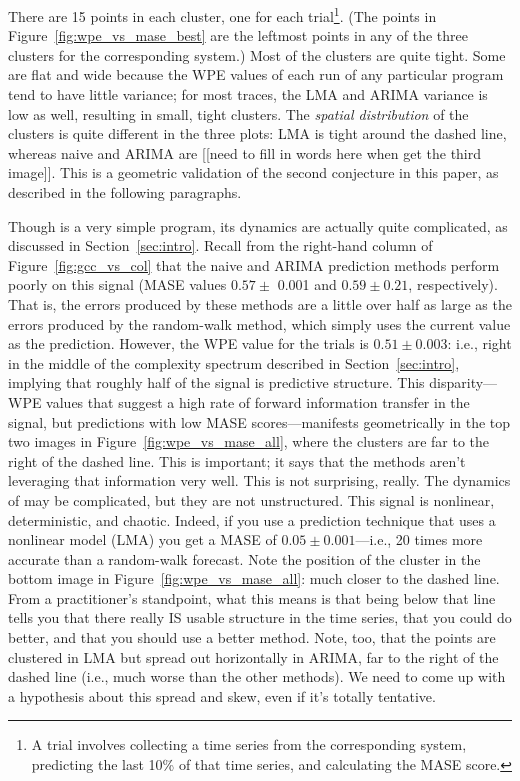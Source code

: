 There are 15 points in each cluster, one for each trial\footnote{A
  trial involves collecting a time series from the corresponding
  system, predicting the last 10\% of that time series, and
  calculating the MASE score.}.  (The points in
Figure~\ref{fig:wpe_vs_mase_best} are the leftmost points in any of
the three clusters for the corresponding system.)  Most of the
clusters are quite tight.  Some are flat and wide because the WPE
values of each run of any particular program tend to have little
variance; for most traces, the LMA and ARIMA variance is low as well,
resulting in small, tight clusters.  The {\sl spatial distribution} of
the clusters is quite different in the three plots: LMA is tight
around the dashed line, whereas naive and ARIMA are [[need to fill in
    words here when get the third image]].  This is a geometric
validation of the second conjecture in this paper, as described in the
following paragraphs.

Though \col is a very simple program, its dynamics are actually quite
complicated, as discussed in Section~\ref{sec:intro}.  Recall from the
right-hand column of Figure~\ref{fig:gcc_vs_col} that the naive and
ARIMA prediction methods perform poorly on this signal (MASE values
$0.57 \pm$ 0.001 and $0.59 \pm 0.21$, respectively).  That is, the
errors produced by these methods are a little over half as large as
the errors produced by the random-walk method, which simply uses the
current value as the prediction.  However, the WPE value for the \col
trials is $0.51 \pm 0.003$: i.e., right in the middle of the
complexity spectrum described in Section~\ref{sec:intro}, implying
that roughly half of the signal is predictive structure.  This
disparity---WPE values that suggest a high rate of forward information
transfer in the signal, but predictions with low MASE
scores---manifests geometrically in the top two images in
Figure~\ref{fig:wpe_vs_mase_all}, where the \col clusters are far to
the right of the dashed line.  This is important; it says that the
methods aren't leveraging that information very well.  This is not
surprising, really.  The dynamics of \col may be complicated, but they
are not unstructured.  This signal is nonlinear, deterministic, and
chaotic.  Indeed, if you use a prediction technique that uses a
nonlinear model (LMA) you get a MASE of $0.05 \pm 0.001$---i.e., 20
times more accurate than a random-walk forecast.  Note the position of
the \col cluster in the bottom image in
Figure~\ref{fig:wpe_vs_mase_all}: much closer to the dashed line.
From a practitioner's standpoint, what this means is that being below
that line tells you that there really IS usable structure in the time
series, that you could do better, and that you should use a better
method.  Note, too, that the \col points are clustered in LMA but
spread out horizontally in ARIMA, far to the right of the dashed line
(i.e., much worse than the other methods).  We need to come up with a
hypothesis about this spread and skew, even if it's totally tentative.

